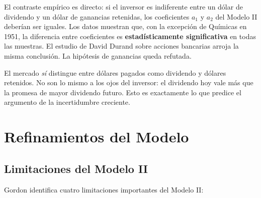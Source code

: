 \documentclass[12pt]{article}
\begin{document}
El contraste emp\'irico es directo: si el inversor es indiferente entre un d\'olar de dividendo y un d\'olar de ganancias retenidas, los coeficientes $a_1$ y $a_2$ del Modelo II deber\'ian ser iguales. Los datos muestran que, con la excepci\'on de Qu\'imicas en 1951, la diferencia entre coeficientes es \textbf{estad\'isticamente significativa} en todas las muestras. El estudio de David Durand sobre acciones bancarias arroja la misma conclusi\'on. La hip\'otesis de ganancias queda refutada.

\begin{intuicion}
El mercado \textit{s\'i} distingue entre d\'olares pagados como dividendo y d\'olares retenidos. No son lo mismo a los ojos del inversor: el dividendo hoy vale m\'as que la promesa de mayor dividendo futuro. Esto es exactamente lo que predice el argumento de la incertidumbre creciente.
\end{intuicion}

\section{Refinamientos del Modelo}

\subsection{Limitaciones del Modelo II}

Gordon identifica cuatro limitaciones importantes del Modelo II:
\end{document}
